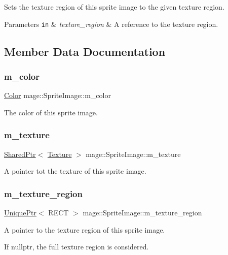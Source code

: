 Sets the texture region of this sprite image to the given texture region.


\begin{DoxyParams}[1]{Parameters}
\mbox{\tt in}  & {\em texture\+\_\+region} & A reference to the texture region. \\
\hline
\end{DoxyParams}


\subsection{Member Data Documentation}
\hypertarget{classmage_1_1_sprite_image_a63331a3170f5af1a14b15913afc59ce2}{}\label{classmage_1_1_sprite_image_a63331a3170f5af1a14b15913afc59ce2} 
\subsubsection{\texorpdfstring{m\+\_\+color}{m\_color}}
{\footnotesize\ttfamily \hyperlink{structmage_1_1_color}{Color} mage\+::\+Sprite\+Image\+::m\+\_\+color\hspace{0.3cm}{\ttfamily [private]}}

The color of this sprite image. \hypertarget{classmage_1_1_sprite_image_a8416fc862782dc019e15275261e7ca15}{}\label{classmage_1_1_sprite_image_a8416fc862782dc019e15275261e7ca15} 
\subsubsection{\texorpdfstring{m\+\_\+texture}{m\_texture}}
{\footnotesize\ttfamily \hyperlink{namespacemage_a1e01ae66713838a7a67d30e44c67703e}{Shared\+Ptr}$<$ \hyperlink{classmage_1_1_texture}{Texture} $>$ mage\+::\+Sprite\+Image\+::m\+\_\+texture\hspace{0.3cm}{\ttfamily [private]}}

A pointer tot the texture of this sprite image. \hypertarget{classmage_1_1_sprite_image_a8d20ef6d6470dc01f73a599060953b65}{}\label{classmage_1_1_sprite_image_a8d20ef6d6470dc01f73a599060953b65} 
\subsubsection{\texorpdfstring{m\+\_\+texture\+\_\+region}{m\_texture\_region}}
{\footnotesize\ttfamily \hyperlink{namespacemage_a3316d7143a973e37adf1110f2e80ca31}{Unique\+Ptr}$<$ R\+E\+CT $>$ mage\+::\+Sprite\+Image\+::m\+\_\+texture\+\_\+region\hspace{0.3cm}{\ttfamily [private]}}

A pointer to the texture region of this sprite image.

If {\ttfamily nullptr}, the full texture region is considered. 